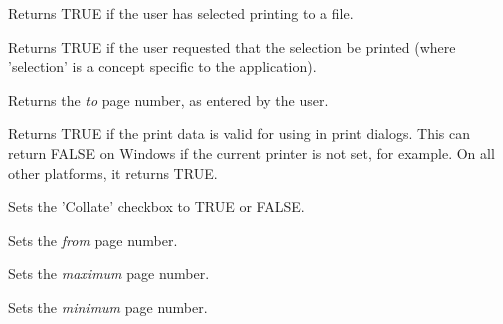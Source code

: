
Returns TRUE if the user has selected printing to a file.

\label{wxprintdialogdatagetselection}


Returns TRUE if the user requested that the selection be printed (where 'selection' is
a concept specific to the application).

\label{wxprintdialogdatagettopage}


Returns the {\it to} page number, as entered by the user.

\label{wxprintdialogdataok}


Returns TRUE if the print data is valid for using in print dialogs.
This can return FALSE on Windows if the current printer is not set, for example.
On all other platforms, it returns TRUE.

\label{wxprintdialogdatasetcollate}


Sets the 'Collate' checkbox to TRUE or FALSE.

\label{wxprintdialogdatasetfrompage}


Sets the {\it from} page number.

\label{wxprintdialogdatasetmaxpage}


Sets the {\it maximum} page number.

\label{wxprintdialogdatasetminpage}


Sets the {\it minimum} page number.

\label{wxprintdialogdatasetnocopies}


